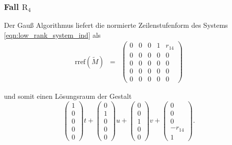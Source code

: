 \documentclass[a4paper,oneside, 11pt, openany%
]{article}
\theoremstyle{custom}
\theoremstyle{custom}
\begin{document}
\subsubsection*{Fall $\text{R}_{4}$}
Der Gauß Algorithmus liefert die normierte Zeilenstufenform des Systems \eqref{eqn:low_rank_system_ind} als
\begin{equation*}\label{eqn:rref_r4}
	\begin{alignedat}{-1}
		\text{rref}(\tilde{M}) &=& 
		\left( \begin{array}{ccccc}				
			0&0&0&1&r_{14}\\
			0&0&0&0&0\\
			0&0&0&0&0\\
			0&0&0&0&0\\
			0&0&0&0&0
		\end{array}
		\right)
	\end{alignedat}
\end{equation*}

und somit einen Lösungsraum der Gestalt
\begin{equation*}
	\begin{pmatrix}
		1\\
		0\\
		0\\
		0\\
		0
	\end{pmatrix}t +
	\begin{pmatrix}
		0\\
		1\\
		0\\
		0\\
		0
	\end{pmatrix}u +
	\begin{pmatrix}
		0\\
		0\\
		1\\			
		0\\
		0
	\end{pmatrix}v +
	\begin{pmatrix}
		0\\
		0\\
		0\\
		-r_{14}\\
		1
	\end{pmatrix}.
\end{equation*}
\end{document}
